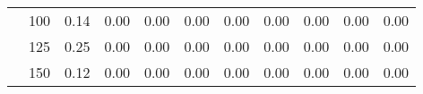 \begin{table}[t]
\begin{center}
\begin{subtable}[c]{\textwidth}
\begin{center}
\begin{tabular}{rcccccccccc}
                                        & \multicolumn{1}{c|}{100}  & \num{0.14}  & \num{0.00}  & \num{0.00}  & \num{0.00}  & \num{0.00}  & \num{0.00}  & \num{0.00}  & \num{0.00}  & \num{0.00}  \\
                                        & \multicolumn{1}{c|}{125}  & \num{0.25}  & \num{0.00}  & \num{0.00}  & \num{0.00}  & \num{0.00}  & \num{0.00}  & \num{0.00}  & \num{0.00}  & \num{0.00}  \\
                                        & \multicolumn{1}{c|}{150}  & \num{0.12}  & \num{0.00}  & \num{0.00}  & \num{0.00}  & \num{0.00}  & \num{0.00}  & \num{0.00}  & \num{0.00}  & \num{0.00}  \\
                                    \end{tabular}
            \end{center}
        \end{subtable}

        \vspace{5mm}


\end{center}
\end{table}
